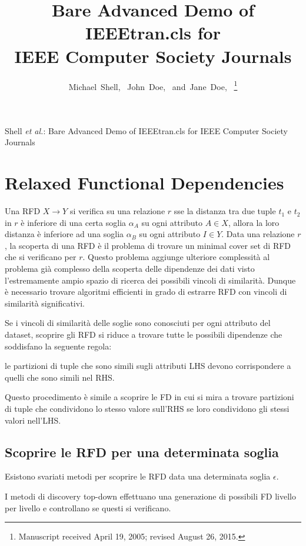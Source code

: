 \documentclass[10pt,journal,compsoc]{IEEEtran}
\begin{document}
\title{Bare Advanced Demo of IEEEtran.cls for\\ IEEE Computer Society Journals}

\author{Michael~Shell,~
        John~Doe,~
        and~Jane~Doe,~%
\thanks{Manuscript received April 19, 2005; revised August 26, 2015.}}

\maketitle
%
{Shell \MakeLowercase{\textit{et al.}}: Bare Advanced Demo of IEEEtran.cls for IEEE Computer Society Journals}

\section{Relaxed Functional Dependencies}
Una RFD $X \rightarrow Y$ si verifica su una relazione $r$ sse la distanza tra due tuple $t_1$ e $t_2$ in $r$ è inferiore di una certa soglia $\alpha_A$ su ogni attributo $A \in X$, allora la loro distanza è inferiore ad una soglia $\alpha_B$ su ogni attributo $I \in Y$. 
Data una relazione $r$, la scoperta di una RFD è il problema di trovare un minimal cover set di RFD che si verificano per $r$. Questo problema aggiunge ulteriore complessità al problema già complesso della scoperta delle dipendenze dei dati visto l'estremamente ampio spazio di ricerca dei possibili vincoli di similarità. Dunque è necessario trovare algoritmi efficienti in grado di estrarre RFD con vincoli di similarità significativi.

Se i vincoli di similarità delle soglie sono conosciuti per ogni attributo del dataset, scoprire gli RFD si riduce a trovare tutte le possibili dipendenze che soddisfano la seguente regola:
\begin{center}
le partizioni di tuple che sono simili sugli attributi LHS devono corrispondere a quelli che sono simili nel RHS.
\end{center}
Questo procedimento è simile a scoprire le FD in cui si mira a trovare partizioni di tuple che condividono lo stesso valore sull'RHS se loro condividono gli stessi valori nell'LHS. 

\subsection{Scoprire le RFD per una determinata soglia}
Esistono svariati metodi per scoprire le RFD data una determinata soglia $\epsilon$.

I metodi di discovery top-down effettuano una generazione di possibili FD livello per livello e controllano se questi si verificano.
\end{document}
